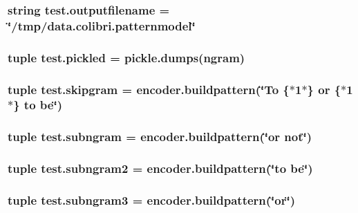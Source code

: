 \subsubsection[{outputfilename}]{\setlength{\rightskip}{0pt plus 5cm}string test.\+outputfilename = \char`\"{}/tmp/data.\+colibri.\+patternmodel\char`\"{}}\label{namespacetest_a11b1ef528efe815402e528cb353937d2}
\hypertarget{namespacetest_ae0a947197ff98632dbd9b9202af2e9d4}{}
\subsubsection[{pickled}]{\setlength{\rightskip}{0pt plus 5cm}tuple test.\+pickled = pickle.\+dumps({\bf ngram})}\label{namespacetest_ae0a947197ff98632dbd9b9202af2e9d4}
\hypertarget{namespacetest_a4c2fb2fac7937b950be064eae096b564}{}
\subsubsection[{skipgram}]{\setlength{\rightskip}{0pt plus 5cm}tuple test.\+skipgram = encoder.\+buildpattern(\char`\"{}To \{$\ast$1$\ast$\} or \{$\ast$1$\ast$\} to be\char`\"{})}\label{namespacetest_a4c2fb2fac7937b950be064eae096b564}
\hypertarget{namespacetest_aebc4bce24c358f86be52bd0827e717e3}{}
\subsubsection[{subngram}]{\setlength{\rightskip}{0pt plus 5cm}tuple test.\+subngram = encoder.\+buildpattern(\char`\"{}or not\char`\"{})}\label{namespacetest_aebc4bce24c358f86be52bd0827e717e3}
\hypertarget{namespacetest_a74ad1b92a76663226004d55408ff5336}{}
\subsubsection[{subngram2}]{\setlength{\rightskip}{0pt plus 5cm}tuple test.\+subngram2 = encoder.\+buildpattern(\char`\"{}to be\char`\"{})}\label{namespacetest_a74ad1b92a76663226004d55408ff5336}
\hypertarget{namespacetest_a91d28841d2bda96a438e76d99dbe6294}{}
\subsubsection[{subngram3}]{\setlength{\rightskip}{0pt plus 5cm}tuple test.\+subngram3 = encoder.\+buildpattern(\char`\"{}or\char`\"{})}\label{namespacetest_a91d28841d2bda96a438e76d99dbe6294}
\hypertarget{namespacetest_aed06428888223bbb3d645936625ebec8}{}
